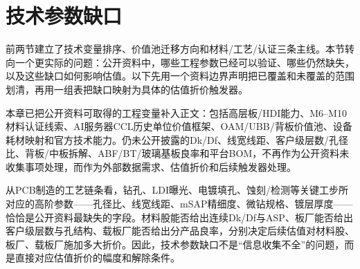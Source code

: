 \section{技术参数缺口}

前两节建立了技术变量排序、价值池迁移方向和材料/工艺/认证三条主线。本节转向一个更实际的问题：公开资料中，哪些工程参数已经可以验证、哪些仍然缺失，以及这些缺口如何影响估值。以下先用一个资料边界声明把已覆盖和未覆盖的范围划清，再用一组表把缺口映射为具体的估值折价触发器。

\begin{sourcequalitybox}[公开资料可量化边界]
本章已把公开资料可取得的工程变量补入正文：包括高层板/HDI能力、M6--M10材料认证线索、AI服务器CCL历史单位价值框架、OAM/UBB/背板价值池、设备耗材映射和官方技术能力。仍未公开披露的Dk/Df、线宽线距、客户级层数/孔径比、背板/中板拆解、ABF/BT/玻璃基板良率和平台BOM，不再作为公开资料未收集事项处理，而作为外部数据需求、估值折价和后续触发器处理。
\end{sourcequalitybox}

从PCB制造的工艺链条看，钻孔、LDI曝光、电镀填孔、蚀刻/检测等关键工步所对应的高阶参数——孔径比、线宽线距、mSAP精细度、微钻规格、镀层厚度——恰恰是公开资料最缺失的字段。材料股能否给出连续Dk/Df与ASP、板厂能否给出客户级层数与孔结构、载板厂能否给出分产品良率，分别决定后续估值对材料股、板厂、载板厂施加多大折价。因此，技术参数缺口不是“信息收集不全”的问题，而是直接对应估值折价的幅度和解除条件。

